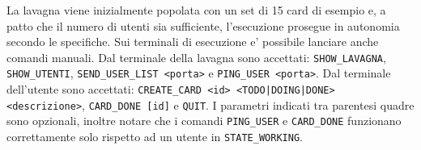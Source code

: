 \documentclass[10pt,a4paper]{article}
\begin{document}
La lavagna viene inizialmente popolata con un set di 15 card di esempio e, a patto che il numero di utenti sia sufficiente, l'esecuzione prosegue in autonomia secondo le specifiche. Sui terminali di esecuzione e' possibile lanciare anche comandi manuali. Dal terminale della lavagna sono accettati: \texttt{SHOW\_LAVAGNA}, \texttt{SHOW\_UTENTI}, \texttt{SEND\_USER\_LIST \textless porta\textgreater} e \texttt{PING\_USER \textless porta\textgreater}. Dal terminale dell'utente sono accettati: \texttt{CREATE\_CARD \textless id\textgreater{} \textless TODO|DOING|DONE\textgreater{} \textless descrizione\textgreater}, \texttt{CARD\_DONE [id]} e \texttt{QUIT}. I parametri indicati tra parentesi quadre sono opzionali, inoltre notare che i comandi \texttt{PING\_USER} e \texttt{CARD\_DONE} funzionano correttamente solo rispetto ad un utente in \texttt{STATE\_WORKING}.
\end{document}
